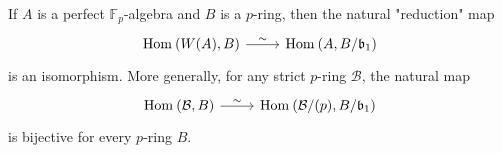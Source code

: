 \begin{prop}\label{UPWittVectors}
	If $A$ is a perfect $\mathbb{F}_p$-algebra and $B$ is a $p$-ring,
	then the natural "reduction" map 
	\begin{equation*}
	\begin{tikzcd}
		\mathrm{Hom}_{  } \left( W(A), B \right)
		\arrow[r, "\sim", rightarrow] &
		\mathrm{Hom}_{  } \left( A, B/\mathfrak{b}_1 \right)
	\end{tikzcd}
	\end{equation*}
	is an isomorphism.
	More generally, for any strict $p$-ring $\mathcal{B}$, the natural map
	\begin{equation*}
	\begin{tikzcd}
		\mathrm{Hom}_{  } \left( \mathcal{B}, B \right)
		\arrow[r, "\sim", rightarrow] &
		\mathrm{Hom}_{  } \left( \mathcal{B}/ (p), B/\mathfrak{b}_1 \right)
	\end{tikzcd}
	\end{equation*}
	is bijective for every $p$-ring $B$.
\end{prop}


